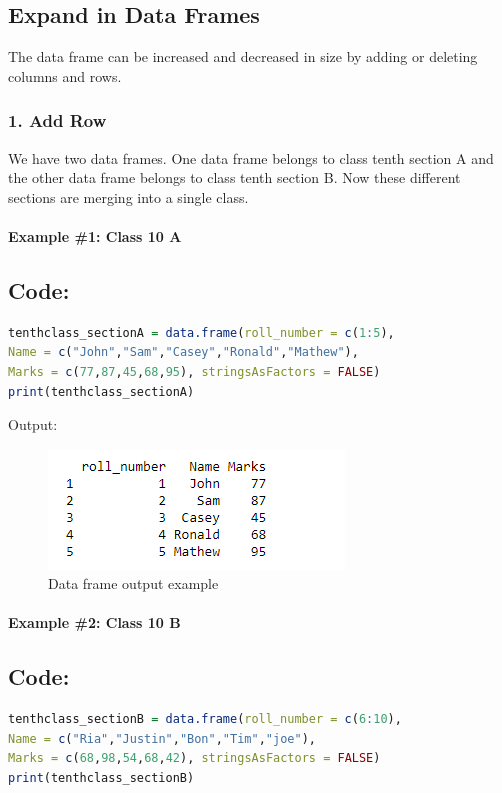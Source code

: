 \documentclass[10pt]{book}
\begin{document}
\subsection*{Expand in Data Frames}
The data frame can be increased and decreased in size by adding or deleting columns and rows.

\subsubsection*{1. Add Row}
We have two data frames. One data frame belongs to class tenth section A and the other data frame belongs to class tenth section B. Now these different sections are merging into a single class.

\paragraph{Example \#1: Class 10 A}
\subsection*{Code:}
\begin{lstlisting}[language=R]
tenthclass_sectionA = data.frame(roll_number = c(1:5),
Name = c("John","Sam","Casey","Ronald","Mathew"),
Marks = c(77,87,45,68,95), stringsAsFactors = FALSE)
print(tenthclass_sectionA)
\end{lstlisting}

\noindent Output:
\begin{figure}[H]
    \begin{flushleft}
        \includegraphics[width=0.7\textwidth]{Data-Frames-in-R-1-6.png}
        \caption{Data frame output example}
        \label{fig:dataframe}
    \end{flushleft}
\end{figure}


\paragraph{Example \#2: Class 10 B}
\subsection*{Code:}
\begin{lstlisting}[language=R]
tenthclass_sectionB = data.frame(roll_number = c(6:10),
Name = c("Ria","Justin","Bon","Tim","joe"),
Marks = c(68,98,54,68,42), stringsAsFactors = FALSE)
print(tenthclass_sectionB)
\end{lstlisting}
\end{document}
